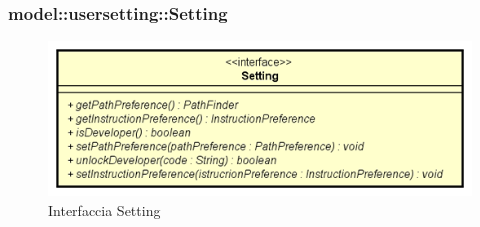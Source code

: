 \documentclass[../DefinizioneDiProdotto.tex]{subfiles}
\begin{document}
\subsubsection{model::usersetting::Setting}

    \begin{figure}[H]
        \centering
        \includegraphics{img/Setting.png}
        \caption{Interfaccia Setting}\label{fig:model::usersetting::Setting} 
    \end{figure}
\end{document}
